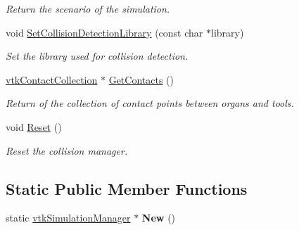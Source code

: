 \begin{DoxyCompactItemize}
\begin{DoxyCompactList}\small\item\em Return the scenario of the simulation. \item\end{DoxyCompactList}\item 
void \hyperlink{classvtkSimulationManager_ad7d4702f7cd3311710f3c0994ef92475}{SetCollisionDetectionLibrary} (const char $\ast$library)
\begin{DoxyCompactList}\small\item\em Set the library used for collision detection. \item\end{DoxyCompactList}\item 
\hypertarget{classvtkSimulationManager_a8bf0753310b43531e451897dd31b41b6}{
\hyperlink{classvtkContactCollection}{vtkContactCollection} $\ast$ \hyperlink{classvtkSimulationManager_a8bf0753310b43531e451897dd31b41b6}{GetContacts} ()}
\label{classvtkSimulationManager_a8bf0753310b43531e451897dd31b41b6}

\begin{DoxyCompactList}\small\item\em Return of the collection of contact points between organs and tools. \item\end{DoxyCompactList}\item 
\hypertarget{classvtkSimulationManager_a5e78deed9ac4a4ccc39eca336b54187e}{
void \hyperlink{classvtkSimulationManager_a5e78deed9ac4a4ccc39eca336b54187e}{Reset} ()}
\label{classvtkSimulationManager_a5e78deed9ac4a4ccc39eca336b54187e}

\begin{DoxyCompactList}\small\item\em Reset the collision manager. \item\end{DoxyCompactList}\end{DoxyCompactItemize}
\subsection*{Static Public Member Functions}
\begin{DoxyCompactItemize}
\item 
\hypertarget{classvtkSimulationManager_afa973a81999bbe10cc7a6fd6bea50493}{
static \hyperlink{classvtkSimulationManager}{vtkSimulationManager} $\ast$ {\bfseries New} ()}
\label{classvtkSimulationManager_afa973a81999bbe10cc7a6fd6bea50493}

\end{DoxyCompactItemize}
